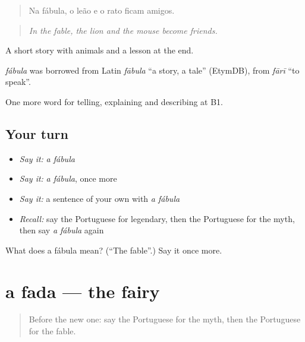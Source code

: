 \begin{quote}
Na fábula, o leão e o rato ficam amigos.
\end{quote}

\begin{quote}
\emph{In the fable, the lion and the mouse become friends.}
\end{quote}

A short story with animals and a lesson at the end.

\begin{cousinweb}
\emph{fábula} was borrowed from Latin \emph{fābula} \textquotedblleft{}a story, a tale\textquotedblright{} (EtymDB), from \emph{fārī} \textquotedblleft{}to speak\textquotedblright{}.
\end{cousinweb}

\begin{grammarlens}[title={What you've built}]
One more word for telling, explaining and describing at B1.
\end{grammarlens}

\subsection*{Your turn}
\begin{itemize}
\raggedright
  \item \emph{Say it:} \emph{a fábula}
  \item \emph{Say it:} \emph{a fábula}, once more
  \item \emph{Say it:} a sentence of your own with \emph{a fábula}
  \item \emph{Recall:} say the Portuguese for legendary, then the Portuguese for the myth, then say \emph{a fábula} again
\end{itemize}

\begin{tcolorbox}[breakable,colback=teal!4,colframe=teal!35!black,title={Before you move on}]
What does a fábula mean? (\textquotedblleft{}The fable\textquotedblright{}.) Say it once more.
\end{tcolorbox}
\section[a fada]{a fada — the fairy}

\label{lesson:PT-C326-fada}



\begin{quote}
Before the new one: say the Portuguese for the myth, then the Portuguese for the fable.
\end{quote}

